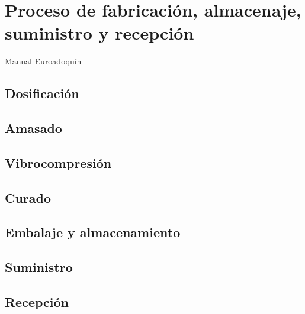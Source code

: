 \chapter{Proceso de fabricación, almacenaje, suministro y recepción}
Manual Euroadoquín
\section{Dosificación}
\section{Amasado}
\section{Vibrocompresión}
\section{Curado}
\section{Embalaje y almacenamiento}
\section{Suministro}
\section{Recepción}
